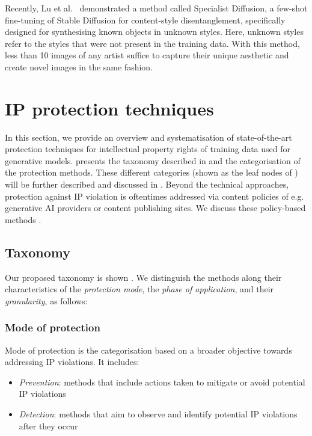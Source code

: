 \documentclass[conference,table]{IEEEtran}
\begin{document}
 


Recently, Lu et al.~\cite{lu_specialist_2023} demonstrated a method called Specialist Diffusion, a few-shot fine-tuning of Stable Diffusion for content-style disentanglement, specifically designed for synthesising known objects in unknown styles. Here, unknown styles refer to the styles that were not present in the training data. With this method, less than 10 images of any artist suffice to capture their unique aesthetic and create novel images in the same fashion.


\section{IP protection techniques}\label{sec:mitigation}
In this section, we provide an overview and systematisation of state-of-the-art protection techniques for intellectual property rights of training data used for generative models.
 presents the taxonomy described in  and the categorisation of the protection methods.
These different categories (shown as the leaf nodes of ) will be further described and discussed in .
Beyond the technical approaches, protection against IP violation is oftentimes addressed via content policies of e.g. generative AI providers or content publishing sites. 
We discuss these policy-based methods .

\subsection{Taxonomy}\label{sec:mitigation-taxonomy}
Our proposed taxonomy is shown . We distinguish the methods along their characteristics of the \textit{protection mode}, the \textit{phase of application}, and their \textit{granularity}, as follows:
\subsubsection{Mode of protection}
Mode of protection is the categorisation based on a broader objective towards addressing IP violations. 
It includes:
\begin{itemize}
    \item \textit{Prevention}: methods that include actions taken to mitigate or avoid potential IP violations  
    \item \textit{Detection}: methods that aim to observe and identify potential IP violations after they occur
\end{itemize}
\end{document}
